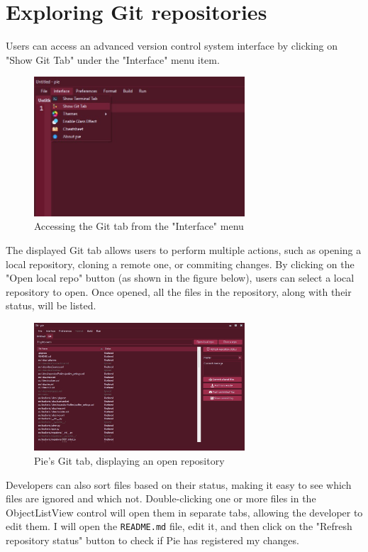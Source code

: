 \section{Exploring Git repositories}

Users can access an advanced version control system interface by clicking on "Show Git Tab" under the "Interface" menu item.

\begin{figure}[H]
\centering
\includegraphics[width=0.7\textwidth]{images/show-git-tab.jpg}
\caption{Accessing the Git tab from the "Interface" menu}
\label{fig:fig2,1.}
\end{figure}

The displayed Git tab allows users to perform multiple actions, such as opening a local repository, cloning a remote one, or commiting changes. By clicking on the "Open local repo" button (as shown in the figure below), users can select a local repository to open. Once opened, all the files in the repository, along with their status, will be listed.

\begin{figure}[H]
\centering
\includegraphics[width=0.7\textwidth]{images/git-tab.jpg}
\caption{Pie's Git tab, displaying an open repository}
\label{fig:fig2,1.}
\end{figure}

Developers can also sort files based on their status, making it easy to see which files are ignored and which not. Double-clicking one or more files in the ObjectListView control will open them in separate tabs, allowing the developer to edit them. I will open the \texttt{README.md} file, edit it, and then click on the "Refresh repository status" button to check if Pie has registered my changes.

